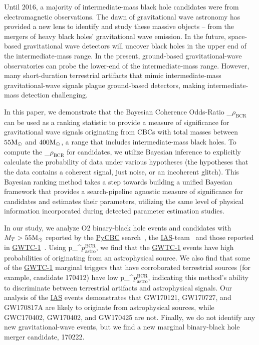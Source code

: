 \documentclass[%
 nofootinbib,
 amsmath,amssymb,
 aps,
 twocolumn,
 superscriptaddress
]{revtex4-2}
\newcommand{\pycbc}{{\sc \href{https://pycbc.org/}{{PyCBC}}}\xspace}
\newcommand{\GWTC}{{\sc \href{https://ui.adsabs.harvard.edu/abs/2019PhRvX...9c1040A/abstract}{{GWTC-1}}}\xspace}
\newcommand{\IAS}{{\sc \href{https://ui.adsabs.harvard.edu/abs/2020PhRvD.101h3030V/abstract}{{IAS}}}\xspace}
\newcommand{\fancytext}[1]{{\relax\ifmmode#1\else $#1$\fi}\xspace}
\newcommand{\mathcmd}[1]{{\sc \relax\ifmmode#1\else $#1$\fi}\xspace}
\newcommand{\bcr}{\mathcmd{\rho_\text{BCR}}}
\newcommand{\msun}{\mathcmd{\text{M}_\odot}}
\newcommand{\pastrobcr}{\fancytext{p_\text{astro}^{\text{BCR}}}}
\begin{document}
Until 2016, a majority of intermediate-mass black hole candidates were from electromagnetic observations. The dawn of gravitational wave astronomy has provided a new lens to identify and study these massive objects -- from the mergers of heavy black holes' gravitational wave emission. In the future, space-based gravitational wave detectors will uncover black holes in the upper end of the intermediate-mass range. In the present, ground-based gravitational-wave observatories can probe the lower-end of the intermediate-mass range. However, many short-duration terrestrial artifacts that mimic intermediate-mass gravitational-wave signals plague ground-based detectors, making intermediate-mass detection challenging. 

In this paper, we demonstrate that the Bayesian Coherence Odds-Ratio \bcr~\cite{BCR1} can be used as a ranking statistic to provide a measure of significance for gravitational wave signals originating from CBCs with total masses between $55\msun$ and $400\msun$, a range that includes intermediate-mass black holes. To compute the \bcr for candidates, we utilize Bayesian inference to explicitly calculate the probability of data under various hypotheses (the hypotheses that the data contains a coherent signal, just noise, or an incoherent glitch). This Bayesian ranking method takes a step towards building a unified Bayesian framework that provides a search-pipeline agnostic measure of significance for candidates and estimates their parameters, utilizing the same level of physical information incorporated during detected parameter estimation studies. 

In our study, we analyze O2 binary-black hole events and candidates with $M_T > 55 \msun$ reported by the \pycbc search~\cite{pycbc_ogc_2}, the \IAS-team~\cite{IAS1, IAS2} and those reported in \GWTC~\cite{GWTC1}. Using \pastrobcr, we find that the \GWTC events have high probabilities of originating from an astrophysical source. We also find that some of the \GWTC marginal triggers that have corroborated terrestrial sources (for example, candidate 170412) have low \pastrobcr, indicating this method's ability to discriminate between terrestrial artifacts and astrophysical signals. Our analysis of the \IAS events demonstrates that GW170121, GW170727, and GW170817A are likely to originate from astrophysical sources, while GWC170402, GW170402, and GW170425  are not. Finally, we do not identify any new gravitational-wave events, but we find a new marginal binary-black hole merger candidate, 170222. 
\end{document}

